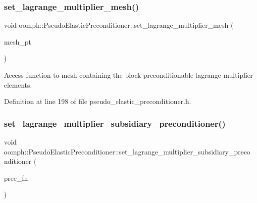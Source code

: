 \subsubsection{\texorpdfstring{set\+\_\+lagrange\+\_\+multiplier\+\_\+mesh()}{set\_lagrange\_multiplier\_mesh()}}
{\footnotesize\ttfamily void oomph\+::\+Pseudo\+Elastic\+Preconditioner\+::set\+\_\+lagrange\+\_\+multiplier\+\_\+mesh (\begin{DoxyParamCaption}\item[{Mesh $\ast$}]{mesh\+\_\+pt }\end{DoxyParamCaption})\hspace{0.3cm}{\ttfamily [inline]}}



Access function to mesh containing the block-\/preconditionable lagrange multiplier elements. 



Definition at line 198 of file pseudo\+\_\+elastic\+\_\+preconditioner.\+h.

\mbox{\label{classoomph_1_1PseudoElasticPreconditioner_a64865a85f35ae9385f9f8d68e75595e0}} 
\subsubsection{\texorpdfstring{set\+\_\+lagrange\+\_\+multiplier\+\_\+subsidiary\+\_\+preconditioner()}{set\_lagrange\_multiplier\_subsidiary\_preconditioner()}}
{\footnotesize\ttfamily void oomph\+::\+Pseudo\+Elastic\+Preconditioner\+::set\+\_\+lagrange\+\_\+multiplier\+\_\+subsidiary\+\_\+preconditioner (\begin{DoxyParamCaption}\item[{\hyperlink{classoomph_1_1PseudoElasticPreconditioner_a1462e1ef48ed2668c06dfd36c783d1a5}{Subsidiary\+Preconditioner\+Fct\+Pt}}]{prec\+\_\+fn }\end{DoxyParamCaption})\hspace{0.3cm}{\ttfamily [inline]}}



